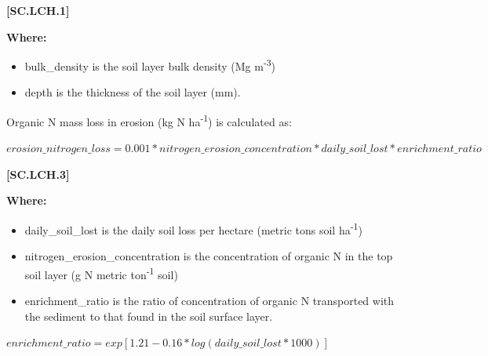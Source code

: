             {\raggedleft \textbf{[SC.LCH.1]}\par}
            \vspace{0.5cm}

        \textbf{Where:}
            
        \begin{itemize}
            \item bulk\_density is the soil layer bulk density (Mg m\textsuperscript{-3})
            \item depth is the thickness of the soil layer (mm).
        \end{itemize}
    \vspace{0.5cm}

Organic N mass loss in erosion (kg N ha\textsuperscript{-1}) is calculated as:
\vspace{0.5cm}
            
    \begin{center}

 \(erosion\_nitrogen\_loss=0.001 * nitrogen\_erosion\_concentration * daily\_soil\_lost  * enrichment\_ratio\)

    \end{center}
        \vspace{0.5cm} 
    
            {\raggedleft \textbf{[SC.LCH.3]}\par}
            \vspace{0.5cm}

        \textbf{Where:}
            
        \begin{itemize}
            \item daily\_soil\_lost is the daily soil loss per hectare (metric tons soil ha\textsuperscript{-1})
            \item nitrogen\_erosion\_concentration  is the concentration of organic N in the top soil layer (g N metric ton\textsuperscript{-1} soil)
            \item enrichment\_ratio is the ratio of concentration of organic N transported with the sediment to that found in the soil surface layer. 
        \end{itemize}
\vspace{0.5cm}
            
    \begin{center}

 \(enrichment\_ratio=exp[1.21-0.16 * log(daily\_soil\_lost  * 1000)]\)

    \end{center}
        \vspace{0.5cm} 
    
